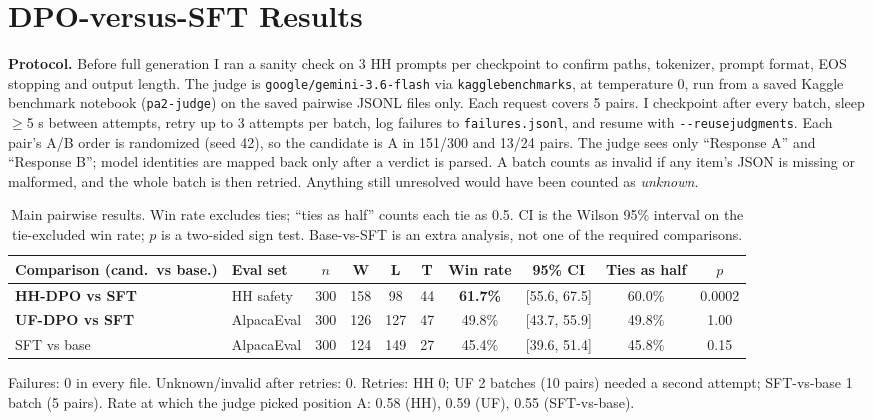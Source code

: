 \documentclass[10pt]{article}
\newcommand{\code}[1]{\texttt{\small #1}}
\renewcommand{\_}{\oldunderscore\allowbreak}
\newcommand{\W}[1]{\textcolor{win}{\textbf{#1}}}
\begin{document}
\section{DPO-versus-SFT Results}

\textbf{Protocol.} Before full generation I ran a sanity check on 3 HH prompts per checkpoint to confirm paths, tokenizer, prompt format, EOS stopping and output length. The judge is \code{google/gemini-3.6-flash} via \code{kaggle\_benchmarks}, at temperature 0, run from a saved Kaggle benchmark notebook (\code{pa2-judge}) on the saved pairwise JSONL files only. Each request covers 5 pairs. I checkpoint after every batch, sleep $\ge$5 s between attempts, retry up to 3 attempts per batch, log failures to \code{*\_failures.jsonl}, and resume with \code{-{}-reuse\_judgments}. Each pair's A/B order is randomized (seed 42), so the candidate is A in 151/300 and 13/24 pairs. The judge sees only ``Response A'' and ``Response B''; model identities are mapped back only after a verdict is parsed. A batch counts as invalid if any item's JSON is missing or malformed, and the whole batch is then retried. Anything still unresolved would have been counted as \emph{unknown}.

\begin{table}[H]
\centering\small
\caption{Main pairwise results. Win rate excludes ties; ``ties as half'' counts each tie as 0.5. CI is the Wilson 95\% interval on the tie-excluded win rate; $p$ is a two-sided sign test. Base-vs-SFT is an extra analysis, not one of the required comparisons.}
\label{tab:main}
\begin{tabular}{@{}l l c c c c c c c c@{}}
\toprule
Comparison (cand.\ vs base.) & Eval set & $n$ & W & L & T & Win rate & 95\% CI & Ties as half & $p$ \\
\midrule
\textbf{HH-DPO vs SFT} & HH safety & 300 & 158 & 98 & 44 & \W{61.7\%} & [55.6, 67.5] & 60.0\% & 0.0002 \\
\textbf{UF-DPO vs SFT} & AlpacaEval & 300 & 126 & 127 & 47 & 49.8\% & [43.7, 55.9] & 49.8\% & 1.00 \\
\rowcolor{rowgray} SFT vs base & AlpacaEval & 300 & 124 & 149 & 27 & 45.4\% & [39.6, 51.4] & 45.8\% & 0.15 \\
\bottomrule
\end{tabular}
\vspace{2pt}

\footnotesize Failures: 0 in every file. Unknown/invalid after retries: 0. Retries: HH 0; UF 2 batches (10 pairs) needed a second attempt; SFT-vs-base 1 batch (5 pairs). Rate at which the judge picked position A: 0.58 (HH), 0.59 (UF), 0.55 (SFT-vs-base).
\end{table}
\end{document}
